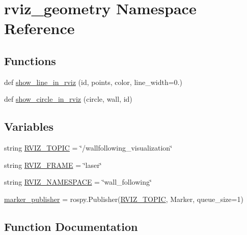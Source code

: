 \hypertarget{namespacerviz__geometry}{}\section{rviz\+\_\+geometry Namespace Reference}
\label{namespacerviz__geometry}
\subsection*{Functions}
\begin{DoxyCompactItemize}
\item 
def \hyperlink{namespacerviz__geometry_a93390c23bebf8db38c31f832225dddda}{show\+\_\+line\+\_\+in\+\_\+rviz} (id, points, color, line\+\_\+width=0.)
\item 
def \hyperlink{namespacerviz__geometry_a07a18d3bf4954414457db93c65b71c2e}{show\+\_\+circle\+\_\+in\+\_\+rviz} (circle, wall, id)
\end{DoxyCompactItemize}
\subsection*{Variables}
\begin{DoxyCompactItemize}
\item 
string \hyperlink{namespacerviz__geometry_a2bfe028bdabf1321495ece3cfc6b4fa6}{R\+V\+I\+Z\+\_\+\+T\+O\+P\+IC} = \char`\"{}/wallfollowing\+\_\+visualization\char`\"{}
\item 
string \hyperlink{namespacerviz__geometry_a3a3837887cc012683c1d87e5027b6863}{R\+V\+I\+Z\+\_\+\+F\+R\+A\+ME} = \char`\"{}laser\char`\"{}
\item 
string \hyperlink{namespacerviz__geometry_ad8626a9cfbc948e43f401fb1f3d62ecb}{R\+V\+I\+Z\+\_\+\+N\+A\+M\+E\+S\+P\+A\+CE} = \char`\"{}wall\+\_\+following\char`\"{}
\item 
\hyperlink{namespacerviz__geometry_ac4b20d63343627f7ac14151eba108ba8}{marker\+\_\+publisher} = rospy.\+Publisher(\hyperlink{namespacerviz__geometry_a2bfe028bdabf1321495ece3cfc6b4fa6}{R\+V\+I\+Z\+\_\+\+T\+O\+P\+IC}, Marker, queue\+\_\+size=1)
\end{DoxyCompactItemize}


\subsection{Function Documentation}
